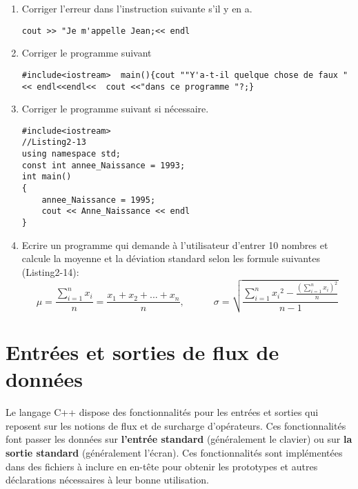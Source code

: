 \documentclass[a4paper, oneside,11pt]{book}
\begin{document}
\begin{enumerate}
\item Corriger l'erreur dans l'instruction suivante s'il y en a.

 \begin{lstlisting}
cout >> "Je m'appelle Jean;<< endl
\end{lstlisting}

\item Corriger le programme suivant

 \begin{lstlisting}
#include<iostream>  main(){cout ""Y'a-t-il quelque chose de faux "
<< endl<<endl<<  cout <<"dans ce programme "?;}
\end{lstlisting}

\item Corriger le programme suivant si n\'ecessaire.

\begin{lstlisting}
#include<iostream>  
//Listing2-13
using namespace std;
const int annee_Naissance = 1993;
int main()
{
    annee_Naissance = 1995;
    cout << Anne_Naissance << endl
}
\end{lstlisting}

\item Ecrire un programme qui demande \`a l'utilisateur d'entrer 10 nombres et calcule la moyenne et la d\'eviation standard selon les formule suivantes (Listing2-14):
\begin{equation*}
\mu = \frac{\sum_{i=1}^{n}x_i}{n} = \frac{x_1 + x_2 + ... + x_n}{n},\quad\quad \quad\sigma = \sqrt{\frac{\sum_{i=1}^{n}x_i{}^{2} - \frac{\left(\sum_{i=1}^{n}x_i\right)^2}{n}}{n-1}}
\end{equation*} 
 
 \end{enumerate}

\chapter{Entr\'ees et sorties de flux de donn\'ees}\label{chap4}
\pagestyle{fancy}
\renewcommand{\chaptermark}[1]{\markboth{#1}{}}
 \rhead{\thepage}

Le langage C++ dispose des fonctionnalit\'es pour les entr\'ees et sorties qui reposent sur les notions de flux et de surcharge d'op\'erateurs. Ces fonctionnalit\'es font passer les 
donn\'ees sur \textbf{l'entr\'ee standard} (g\'en\'eralement le clavier) ou sur \textbf{la sortie standard} (g\'en\'eralement l'\'ecran). 
Ces fonctionnalit\'es sont impl\'ement\'ees dans des fichiers \`a inclure en en-t\^ete pour obtenir les prototypes et autres d\'eclarations n\'ecessaires \`a leur bonne utilisation.
\end{document}
